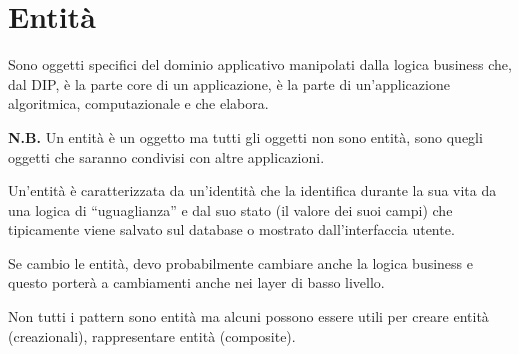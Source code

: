 \chapter{Entità}

Sono oggetti specifici del dominio applicativo manipolati dalla logica business che, dal DIP, è la parte core di un applicazione, è la parte di un’applicazione 
algoritmica, computazionale e che elabora.
\medskip

\textbf{N.B.} Un entità è un oggetto ma tutti gli oggetti non sono entità, sono quegli oggetti che saranno condivisi con altre applicazioni.
\medskip

Un’entità è caratterizzata da un’identità che la identifica durante la sua vita da una logica di “uguaglianza” e dal suo stato (il valore dei suoi campi) che 
tipicamente viene salvato sul database o mostrato dall’interfaccia utente.

Se cambio le entità, devo probabilmente cambiare anche la logica business e questo porterà a cambiamenti anche nei layer di basso livello.

Non tutti i pattern sono entità ma alcuni possono essere utili per creare entità (creazionali), rappresentare entità (composite).

